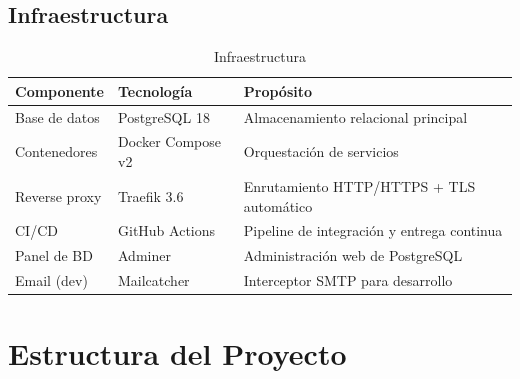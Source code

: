 \subsection{Infraestructura}\label{infraestructura}

\begin{longtable}[]{@{}
  >{\raggedright\arraybackslash}p{}
  >{\raggedright\arraybackslash}p{}
  >{\raggedright\arraybackslash}p{}@{}}
\caption[Infraestructura]{Infraestructura}\tabularnewline
\toprule\noalign{}
\begin{minipage}[b]{\linewidth}\raggedright
Componente
\end{minipage} & \begin{minipage}[b]{\linewidth}\raggedright
Tecnología
\end{minipage} & \begin{minipage}[b]{\linewidth}\raggedright
Propósito
\end{minipage} \\
\midrule\noalign{}
\endhead
\bottomrule\noalign{}
\endlastfoot
Base de datos & PostgreSQL 18 & Almacenamiento relacional principal \\
Contenedores & Docker Compose v2 & Orquestación de servicios \\
Reverse proxy & Traefik 3.6 & Enrutamiento HTTP/HTTPS + TLS automático \\
CI/CD & GitHub Actions & Pipeline de integración y entrega continua \\
Panel de BD & Adminer & Administración web de PostgreSQL \\
Email (dev) & Mailcatcher & Interceptor SMTP para desarrollo \\
\end{longtable}

\section{Estructura del Proyecto}\label{estructura-del-proyecto}

